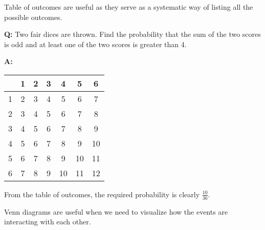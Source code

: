 \begin{method}
    Table of outcomes are useful as they serve as a systematic way of listing all the possible outcomes.
\end{method}

\begin{example}
    \phantom{.}
    
    \textbf{Q:} Two fair dices are thrown. Find the probability that the sum of the two scores is odd and at least one of the two scores is greater than 4.

    \textbf{A:}
    \begin{center}
        \begin{tabular}{|c|c|c|c|c|c|c|}
            \hline  & 1 & 2 & 3 & 4 & 5 & 6\\\hline
            1 & 2 & 3 & 4 & 5 & 6 & \cellcolor{ForestGreen!20}7 \\ \hline
            2 & 3 & 4 & 5 & 6 & \cellcolor{ForestGreen!20}7 & 8 \\ \hline
            3 & 4 & 5 & 6 & 7 & 8 & \cellcolor{ForestGreen!20}9 \\ \hline
            4 & 5 & 6 & 7 & 8 & \cellcolor{ForestGreen!20}9 & 10 \\ \hline
            5 & 6 & \cellcolor{ForestGreen!20}7 & 8 & \cellcolor{ForestGreen!20}9 & 10 & \cellcolor{ForestGreen!20}11 \\ \hline
            6 & \cellcolor{ForestGreen!20}7 & 8 & \cellcolor{ForestGreen!20}9 & 10 & \cellcolor{ForestGreen!20}11 & 12 \\ \hline
          \end{tabular}
    \end{center}
    From the table of outcomes, the required probability is clearly $\frac{10}{36}$.
\end{example}

\begin{method}
    Venn diagrams are useful when we need to visualize how the events are interacting with each other.
\end{method}

